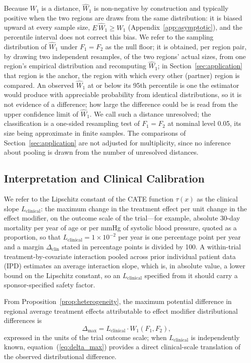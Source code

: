 \documentclass[AMA,Times1COL]{WileyNJDv5}
\begin{document}
Because $W_1$ is a distance, $\widehat{W}_1$ is non-negative by construction and typically positive when the two regions are draws from the same distribution: it is biased upward at every sample size, $E\,\widehat{W}_1 \geq W_1$ (Appendix~\ref{app:asymptotic}), and the percentile interval does not correct this bias. %
We refer to the sampling distribution of $\widehat{W}_1$ under $F_1 = F_2$ as the null floor; it is obtained, per region pair, by drawing two independent resamples, of the two regions' actual sizes, from one region's empirical distribution and recomputing $\widehat{W}_1$; in Section~\ref{sec:application} that region is the anchor, the region with which every other (partner) region is compared. An observed $\widehat{W}_1$ at or below its 95th percentile is one the estimator would produce with appreciable probability from identical distributions, so it is not evidence of a difference; how large the difference could be is read from the upper confidence limit of $\widehat{W}_1$. We call such a distance unresolved; the classification is a one-sided resampling test of $F_1 = F_2$ at nominal level 0.05, its size being approximate in finite samples. The comparisons of Section~\ref{sec:application} are not adjusted for multiplicity, since no inference about pooling is drawn from the number of unresolved distances.

\subsection{Interpretation and Clinical Calibration}\label{sec:inference}


We refer to the Lipschitz constant of the CATE function $\tau(x)$ as the clinical slope $L_{\text{clinical}}$: the maximum change in the treatment effect per unit change in the effect modifier, on the outcome scale of the trial---for example, absolute 30-day mortality per year of age or per mmHg of systolic blood pressure, quoted as a proportion, so that $L_{\text{clinical}} = 1 \times 10^{-2}$ per year is one percentage point per year and a margin $\Delta_{\text{clin}}$ stated in percentage points is divided by 100. A within-trial treatment-by-covariate interaction pooled across prior individual patient data (IPD)\cite{fisher2017} estimates an average interaction slope, which is, in absolute value, a lower bound on the Lipschitz constant, so an $L_{\text{clinical}}$ specified from it should carry a sponsor-specified safety factor.

From Proposition~\ref{prop:heterogeneity}, the maximum potential difference in regional average treatment effects attributable to effect modifier distributional differences is
\begin{equation}
\Delta_{\max} = L_{\text{clinical}} \cdot W_1(F_1, F_2),
\label{eq:delta_max}
\end{equation}
expressed in the units of the trial outcome scale; when $L_{\text{clinical}}$ is independently known, equation~(\ref{eq:delta_max}) provides a direct clinical-scale translation of the observed distributional difference.
\end{document}
